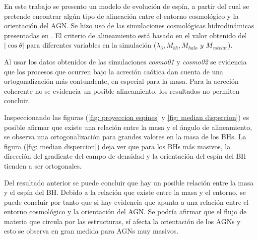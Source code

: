 
En este trabajo se presento un modelo de evolución de espín, a partir del cual se pretende encontrar algún tipo de alineación entre el entorno cosmológico y la orientación del AGN. Se hizo uso de las simulaciones cosmológicas hidrodinámicas presentadas en \cite{Bustamante2018b}. El criterio de alineamiento está basado en el valor obtenido del $|\cos \theta|$ para diferentes variables en la simulación ($\lambda_{3}, M_{bh}, M_{halo} \,\, y \,\, M_{estelar}$). 

Al usar los datos obtenidos de las simulaciones {\it{cosmo01}} y {\it{cosmo02}} se evidencia que los procesos que ocurren bajo la acreción caótica dan cuenta de una ortogonalización más contundente, en especial para la masa. Para la acreción coherente no se evidencia un posible alineamiento, los resultados no permiten concluir. 

Inspeccionando las figuras (\ref{fig: proyeccion espines} y \ref{fig: median dispercion}) es posible afirmar que existe una relación entre la masa y el ángulo de alineamiento, se observa una ortogonalización  para grandes valores en la masa de los BHs. La figura (\ref{fig: median dispercion}) deja ver que para los BHs más masivos, la dirección del gradiente del campo de densidad y la orientación del espín del BH tienden a ser ortogonales. 

Del resultado anterior se puede concluir que hay un posible relación entre la masa y el espín del BH. Debido a la relación que existe entre la masa y el entorno, se puede concluir por tanto que si hay evidencia que apunta a una relación entre el entorno cosmológico y la orientación del AGN. Se podría afirmar que el flujo de materia que circula por las estructuras, sí afecta la orientación de los AGNs y esto se observa en gran medida para AGNs muy masivos.





